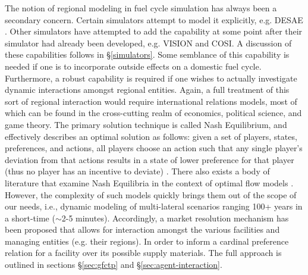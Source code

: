 The notion of regional modeling in fuel cycle simulation has always been a
secondary concern. Certain simulators attempt to model it explicitly, e.g. DESAE
\cite{iaea_nuclear_2010}. Other simulators have attempted to add the capability
at some point after their simulator had already been developed, e.g. VISION and
COSI. A discussion of these capabilities follows in \S\ref{simulators}. Some
semblance of this capability is needed if one is to incorporate outside effects
on a domestic fuel cycle. Furthermore, a robust capability is required if one
wishes to actually investigate dynamic interactions amongst regional
entities. Again, a full treatment of this sort of regional interaction would
require international relations models, most of which can be found in the
cross-cutting realm of economics, political science, and game theory. The
primary solution technique is called Nash Equilibrium, and effectively describes
an optimal solution as follows: given a set of players, states, preferences,
and actions, all players choose an action such that any single player's
deviation from that actions results in a state of lower preference for that
player (thus no player has an incentive to deviate)
\cite{mccarty_political_2007}. There also exists a body of literature that
examine Nash Equilibria in the context of optimal flow models
\cite{mazumdar_fairness_1991,nagurney_supply_2002,song_nash_2002}. However, the
complexity of such models quickly brings them out of the scope of our needs,
i.e., dynamic modeling of multi-lateral scenarios ranging 100+ years in a
short-time ($\sim$2-5 minutes). Accordingly, a market resolution mechanism has
been proposed that allows for interaction amongst the various facilities and
managing entities (e.g. their regions). In order to inform a cardinal preference
\cite{strotz_cardinal_1953} relation for a facility over its possible supply
materials. The full approach is outlined in sections \S\ref{sec:gfctp} and
\S\ref{sec:agent-interaction}.
